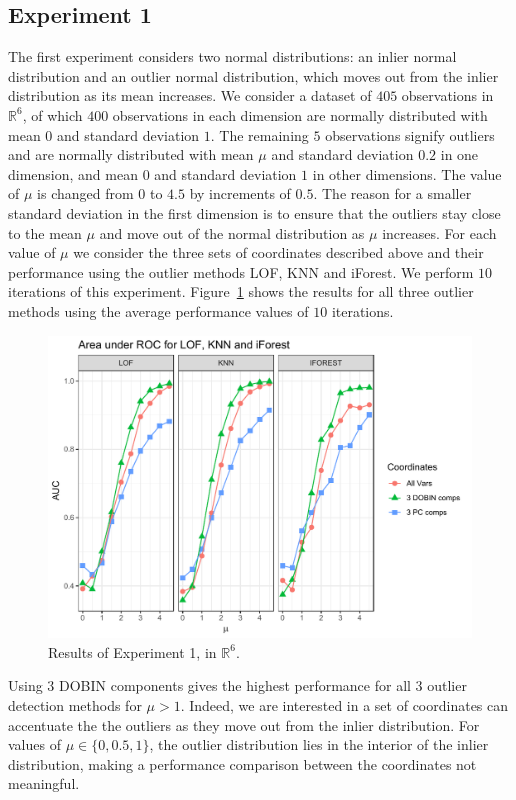 \documentclass[11pt]{article}
\begin{document}
\subsection{Experiment 1}
The first experiment considers two normal distributions: an  inlier normal distribution and an outlier normal distribution, which moves out from the inlier distribution as its mean increases. We consider a dataset of $405$ observations in $\mathbb{R}^6$, of which $400$ observations in each dimension are normally distributed with mean $0$ and standard deviation $1$. The remaining $5$ observations signify outliers and are normally distributed with mean $\mu$ and standard deviation $0.2$ in one dimension, and mean $0$ and standard deviation $1$ in other dimensions. The value of $\mu$ is changed from $0$ to $4.5$ by increments of $0.5$. The reason for a smaller standard deviation in the first dimension is to ensure that the outliers stay close to the mean $\mu$ and move out of the normal distribution as $\mu$ increases. For each value of $\mu$ we consider the three sets of coordinates described above and their performance using the outlier methods LOF, KNN and iForest.  We perform $10$ iterations of this experiment. Figure~\ref{fig:Exp1} shows the results for all three  outlier methods using the average performance values of $10$ iterations. 

\begin{figure}[!ht]
	\centering
	\includegraphics[scale=0.5]{Exp1.pdf}
	\caption{Results of Experiment 1, in $\mathbb{R}^6$.}
	\label{fig:Exp1}
\end{figure} 

Using $3$ DOBIN components gives the highest performance for all $3$ outlier detection methods for $\mu > 1$.  Indeed, we are interested in a set of coordinates can accentuate the the outliers as they move out from the inlier distribution.  For values of $\mu \in \{0, 0.5, 1\}$,  the outlier distribution lies in the interior of the inlier distribution, making a performance comparison between the coordinates not meaningful.   
\end{document}
